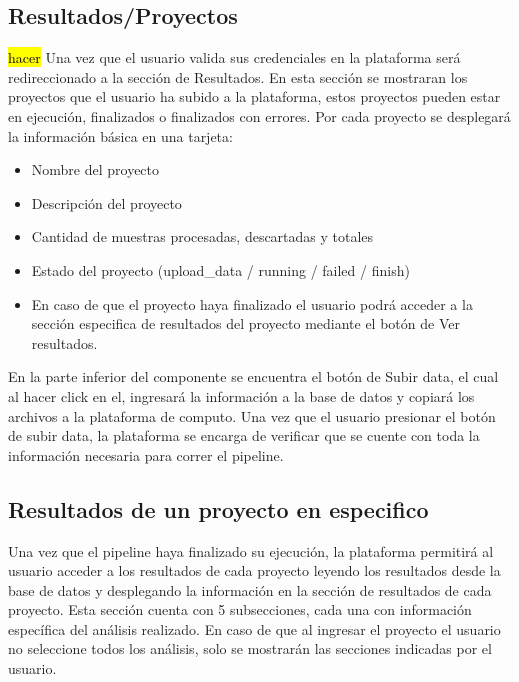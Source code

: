 \subsection{Resultados/Proyectos} \label{projects}
\hl{hacer}
Una vez que el usuario valida sus credenciales en la plataforma será redireccionado a la sección de Resultados. En esta sección se mostraran los proyectos que el usuario ha subido a la plataforma, estos proyectos pueden estar en ejecución, finalizados o finalizados con errores. 
Por cada proyecto se desplegará la información básica en una tarjeta:
\begin{itemize}
    \item Nombre del proyecto
    \item Descripción del proyecto
    \item Cantidad de muestras procesadas, descartadas y totales
    \item Estado del proyecto (upload\_data / running / failed / finish)
    \item En caso de que el proyecto haya finalizado el usuario podrá acceder a la sección especifica de resultados del proyecto mediante el botón de Ver resultados.
\end{itemize}



En la parte inferior del componente se encuentra el botón de Subir data, el cual al hacer click en el, ingresará la información a la base de datos y copiará los archivos a la plataforma de computo. Una vez que el usuario presionar el botón de subir data, la plataforma se encarga de verificar que se cuente con toda la información necesaria para correr el pipeline.
\subsection{Resultados de un proyecto en especifico}
Una vez que el pipeline haya finalizado su ejecución, la plataforma permitirá al usuario acceder a los resultados de cada proyecto leyendo los resultados desde la base de datos y desplegando la información en la sección de resultados de cada proyecto.
Esta sección cuenta con 5 subsecciones, cada una con información específica del análisis realizado. 
En caso de que al ingresar el proyecto el usuario no seleccione todos los análisis, solo se mostrarán las secciones indicadas por el usuario.

